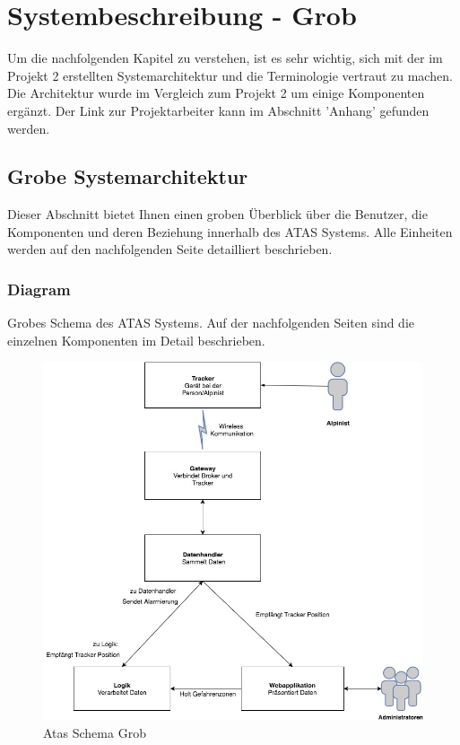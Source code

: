 \documentclass[11pt,english,german]{report}
\theoremstyle{definition}
\begin{document}
\chapter{Systembeschreibung - Grob}
Um die nachfolgenden Kapitel zu verstehen, ist es sehr wichtig, sich mit der im Projekt 2 erstellten Systemarchitektur und die Terminologie vertraut zu machen. Die Architektur wurde im Vergleich zum Projekt 2 um einige Komponenten ergänzt. Der Link zur Projektarbeiter kann im Abschnitt 'Anhang' gefunden werden.

\section{Grobe Systemarchitektur}
Dieser Abschnitt bietet Ihnen einen groben Überblick über die Benutzer, die Komponenten und deren Beziehung innerhalb des ATAS Systems. Alle Einheiten werden auf den nachfolgenden Seite detailliert beschrieben.

\newpage
\subsection{Diagram}
Grobes Schema des ATAS Systems. Auf der nachfolgenden Seiten sind die einzelnen Komponenten im Detail beschrieben.\\[0.3cm]
\begin{figure}[H]
	\centering
	\includegraphics[width=\textwidth]{img/system/ATAS_SystemOverview_Abstract_BA.jpg}
	\caption[Atas Schema Grob]
	{Atas Schema Grob}
\end{figure}
\end{document}
